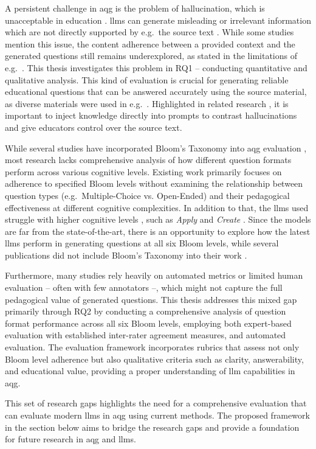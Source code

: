  A persistent challenge in \ac{aqg} is the problem of hallucination, which is unacceptable in education \cite{yang_heuristic_2024}. \ac{llms} can generate misleading or irrelevant information which are not directly supported by e.g.\ the source text \cite{al_faraby_analysis_2024,duong-trung_bloomllm_2024}. While some studies mention this issue, the content adherence between a provided context and the generated questions still remains underexplored, as stated in the limitations of e.g.\ \cite{doughty_comparative_2024,al_faraby_analysis_2024}. This thesis investigates this problem in RQ1 -- conducting quantitative and qualitative analysis. This kind of evaluation is crucial for generating reliable educational questions that can be answered accurately using the source material, as diverse materials were used in e.g.\ \cite{scaria_how_2024,maity_can_2025,blobstein_angel_2023}. Highlighted in related research \cite{biancini_multiple-choice_2024}, it is important to inject knowledge directly into prompts to contrast hallucinations and give educators control over the source text.

 While several studies have incorporated Bloom's Taxonomy into \ac{aqg} evaluation \cite{scaria_how_2024, maity_can_2025, blobstein_angel_2023}, most research lacks comprehensive analysis of how different question formats perform across various cognitive levels. Existing work primarily focuses on adherence to specified Bloom levels without examining the relationship between question types (e.g.\ Multiple-Choice vs. Open-Ended) and their pedagogical effectiveness at different cognitive complexities. In addition to that, the \ac{llms} used struggle with higher cognitive levels \cite{blobstein_angel_2023}, such as \textit{Apply} and \textit{Create} \cite{scaria_how_2024}. Since the models are far from the state-of-the-art, there is an opportunity to explore how the latest \ac{llms} perform in generating questions at all six Bloom levels, while several publications did not include Bloom's Taxonomy into their work \cite{al_faraby_analysis_2024,vu_chatgpt-based_2024,hang_mcqgen_2024}. 

Furthermore, many studies rely heavily on automated metrics or limited human evaluation \cite{zhuge_twinstar_2025,blobstein_angel_2023,li_planning_2024} -- often with few annotators --, which might not capture the full pedagogical value of generated questions. This thesis addresses this mixed gap primarily through RQ2 by conducting a comprehensive analysis of question format performance across all six Bloom levels, employing both expert-based evaluation with established inter-rater agreement measures, and automated evaluation. The evaluation framework incorporates rubrics that assess not only Bloom level adherence but also qualitative criteria such as clarity, answerability, and educational value, providing a proper understanding of \ac{llm} capabilities in \ac{aqg}.

This set of research gaps highlights the need for a comprehensive evaluation that can evaluate modern \ac{llms} in \ac{aqg} using current methods. The proposed framework in the section below aims to bridge the research gaps and provide a foundation for future research in \ac{aqg} and \ac{llms}.